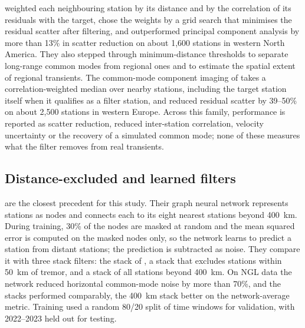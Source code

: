 \documentclass[11pt,a4paper]{article}
\begin{document}
\citet{tianshen2016} weighted each neighbouring station by its distance and by the correlation of its residuals with the target, chose the weights by a grid search that minimises the residual scatter after filtering, and outperformed principal component analysis by more than 13\% in scatter reduction on about 1,600 stations in western North America. They also stepped through minimum-distance thresholds to separate long-range common modes from regional ones and to estimate the spatial extent of regional transients. The common-mode component imaging of \citet{kreemer2021} takes a correlation-weighted median over nearby stations, including the target station itself when it qualifies as a filter station, and reduced residual scatter by 39--50\% on about 2,500 stations in western Europe. Across this family, performance is reported as scatter reduction, reduced inter-station correlation, velocity uncertainty or the recovery of a simulated common mode; none of these measures what the filter removes from real transients.

\subsection{Distance-excluded and learned filters}

\citet{bachelot2025} are the closest precedent for this study. Their graph neural network represents stations as nodes and connects each to its eight nearest stations beyond 400~km. During training, 30\% of the nodes are masked at random and the mean squared error is computed on the masked nodes only, so the network learns to predict a station from distant stations; the prediction is subtracted as noise. They compare it with three stack filters: the stack of \citet{wdowinski1997}, a stack that excludes stations within 50~km of tremor, and a stack of all stations beyond 400~km. On NGL data the network reduced horizontal common-mode noise by more than 70\%, and the stacks performed comparably, the 400~km stack better on the network-average metric. Training used a random 80/20 split of time windows for validation, with 2022--2023 held out for testing.
\end{document}
